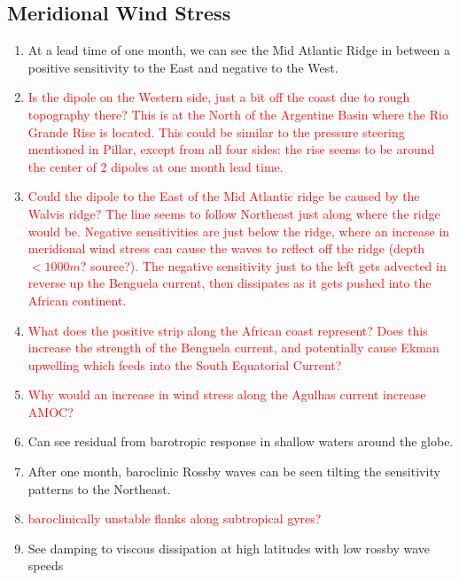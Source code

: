 \documentclass[a4paper,11pt]{article}
\newcommand{\red}[1]{\textcolor{red}{#1}}
\begin{document}
   \subsection{Meridional Wind Stress}
    \begin{enumerate}
	\item At a lead time of one month, we can see the Mid Atlantic Ridge in between a positive sensitivity to the East and negative to the West. 
	\item \red{Is the dipole on the Western side, just a bit off the coast due to rough topography there? This is at the North of the Argentine Basin where the Rio Grande Rise is located. This could be similar to the pressure steering mentioned in Pillar, except from all four sides: the rise seems to be around the center of 2 dipoles at one month lead time. }
	\item \red{Could the dipole to the East of the Mid Atlantic ridge be caused by the Walvis ridge? The line seems to follow Northeast just along where the ridge would be. Negative sensitivities are just below the ridge, where an increase in meridional wind stress can cause the waves to reflect off the ridge (depth $<1000m$? source?). The negative sensitivity just to the left gets advected in reverse up the Benguela current, then dissipates as it gets pushed into the African continent.}
	\item \red{What does the positive strip along the African coast represent? Does this increase the strength of the Benguela current, and potentially cause Ekman upwelling which feeds into the South Equatorial Current?}
	\item \red{Why would an increase in wind stress along the Agulhas current increase AMOC?}
	\item Can see residual from barotropic response in shallow waters around the globe. 
	\item After one month, baroclinic Rossby waves can be seen tilting the sensitivity patterns to the Northeast. 
	\item \red{baroclinically unstable flanks along subtropical gyres?}
	\item See damping to viscous dissipation at high latitudes with low rossby wave speeds
    \end{enumerate} 
\end{document}
